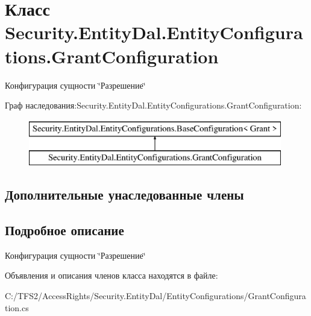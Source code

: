 \hypertarget{class_security_1_1_entity_dal_1_1_entity_configurations_1_1_grant_configuration}{}\section{Класс Security.\+Entity\+Dal.\+Entity\+Configurations.\+Grant\+Configuration}
\label{class_security_1_1_entity_dal_1_1_entity_configurations_1_1_grant_configuration}


Конфигурация сущности \char`\"{}Разрешение\char`\"{}  


Граф наследования\+:Security.\+Entity\+Dal.\+Entity\+Configurations.\+Grant\+Configuration\+:\begin{figure}[H]
\begin{center}
\leavevmode
\includegraphics[height=2.000000cm]{d5/df7/class_security_1_1_entity_dal_1_1_entity_configurations_1_1_grant_configuration}
\end{center}
\end{figure}
\subsection*{Дополнительные унаследованные члены}


\subsection{Подробное описание}
Конфигурация сущности \char`\"{}Разрешение\char`\"{} 



Объявления и описания членов класса находятся в файле\+:\begin{DoxyCompactItemize}
\item 
C\+:/\+T\+F\+S2/\+Access\+Rights/\+Security.\+Entity\+Dal/\+Entity\+Configurations/Grant\+Configuration.\+cs\end{DoxyCompactItemize}
